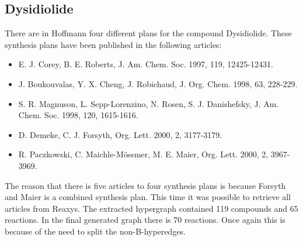 \documentclass[a4paper,10pt,titlepage]{paper}
\begin{document}
\subsection{Dysidiolide}
There are in Hoffmann\cite{SynthesisPlans} four different plans for the compound Dysidiolide. These synthesis plans have been published in the following articles:
\begin{itemize}
\item
E. J. Corey, B. E. Roberts, J. Am. Chem. Soc. 1997, 119, 12425-12431.
\item
J. Boukouvalas, Y. X. Cheng, J. Robichaud, J. Org. Chem. 1998, 63, 228-229.
\item
S. R. Magnuson, L. Sepp-Lorenzino, N. Rosen, S. J. Danishefsky, J. Am. Chem.
Soc. 1998, 120, 1615-1616.
\item
D. Demeke, C. J. Forsyth, Org. Lett. 2000, 2, 3177-3179.
\item
R. Paczkowski, C. Maichle-Mössmer, M. E. Maier, Org. Lett. 2000, 2, 3967-3969.
\end{itemize}
The reason that there is five articles to four synthesis plans is because Forsyth and Maier is a combined synthesis plan. This time it was possible to retrieve all articles from Reaxys. The extracted hypergraph contained 119 compounds and 65 reactions. In the final generated graph there is 70 reactions. Once again this is because of the need to split the non-B-hyperedges.
\end{document}
